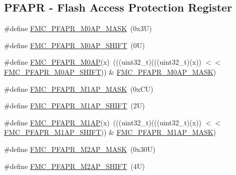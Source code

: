 \subsection*{P\+F\+A\+PR -\/ Flash Access Protection Register}
\begin{DoxyCompactItemize}
\item 
\#define \mbox{\hyperlink{group___f_m_c___register___masks_gac1ee4a2aca52fe6f68d05ce0b43dd6b8}{F\+M\+C\+\_\+\+P\+F\+A\+P\+R\+\_\+\+M0\+A\+P\+\_\+\+M\+A\+SK}}~(0x3\+U)
\item 
\#define \mbox{\hyperlink{group___f_m_c___register___masks_gaff9b97ca7b6e58fe7aa92c088e2f2fe1}{F\+M\+C\+\_\+\+P\+F\+A\+P\+R\+\_\+\+M0\+A\+P\+\_\+\+S\+H\+I\+FT}}~(0\+U)
\item 
\#define \mbox{\hyperlink{group___f_m_c___register___masks_gab97b8b95ec08fb228b89f8d69109e233}{F\+M\+C\+\_\+\+P\+F\+A\+P\+R\+\_\+\+M0\+AP}}(x)~(((uint32\+\_\+t)(((uint32\+\_\+t)(x)) $<$$<$ \mbox{\hyperlink{group___f_m_c___register___masks_gaff9b97ca7b6e58fe7aa92c088e2f2fe1}{F\+M\+C\+\_\+\+P\+F\+A\+P\+R\+\_\+\+M0\+A\+P\+\_\+\+S\+H\+I\+FT}})) \& \mbox{\hyperlink{group___f_m_c___register___masks_gac1ee4a2aca52fe6f68d05ce0b43dd6b8}{F\+M\+C\+\_\+\+P\+F\+A\+P\+R\+\_\+\+M0\+A\+P\+\_\+\+M\+A\+SK}})
\item 
\#define \mbox{\hyperlink{group___f_m_c___register___masks_ga8b0888db1811509a1b7581445a8a1573}{F\+M\+C\+\_\+\+P\+F\+A\+P\+R\+\_\+\+M1\+A\+P\+\_\+\+M\+A\+SK}}~(0x\+C\+U)
\item 
\#define \mbox{\hyperlink{group___f_m_c___register___masks_gac50a9d09140ddfce2457e804b44d2ce5}{F\+M\+C\+\_\+\+P\+F\+A\+P\+R\+\_\+\+M1\+A\+P\+\_\+\+S\+H\+I\+FT}}~(2\+U)
\item 
\#define \mbox{\hyperlink{group___f_m_c___register___masks_gad2184109a8267fe065c175e7121dc572}{F\+M\+C\+\_\+\+P\+F\+A\+P\+R\+\_\+\+M1\+AP}}(x)~(((uint32\+\_\+t)(((uint32\+\_\+t)(x)) $<$$<$ \mbox{\hyperlink{group___f_m_c___register___masks_gac50a9d09140ddfce2457e804b44d2ce5}{F\+M\+C\+\_\+\+P\+F\+A\+P\+R\+\_\+\+M1\+A\+P\+\_\+\+S\+H\+I\+FT}})) \& \mbox{\hyperlink{group___f_m_c___register___masks_ga8b0888db1811509a1b7581445a8a1573}{F\+M\+C\+\_\+\+P\+F\+A\+P\+R\+\_\+\+M1\+A\+P\+\_\+\+M\+A\+SK}})
\item 
\#define \mbox{\hyperlink{group___f_m_c___register___masks_gab3e23f648e34da06b351ac745476f30c}{F\+M\+C\+\_\+\+P\+F\+A\+P\+R\+\_\+\+M2\+A\+P\+\_\+\+M\+A\+SK}}~(0x30\+U)
\item 
\#define \mbox{\hyperlink{group___f_m_c___register___masks_ga05f65455021f093de56e9e086f7185ee}{F\+M\+C\+\_\+\+P\+F\+A\+P\+R\+\_\+\+M2\+A\+P\+\_\+\+S\+H\+I\+FT}}~(4\+U)

\end{DoxyCompactItemize}
